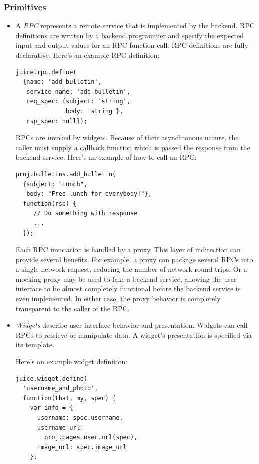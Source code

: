 \documentclass[10pt, twocolumn]{article}
\begin{document}
\subsubsection{Primitives}
\begin{itemize}
\item A \emph{RPC} represents a remote service that is implemented
  by the backend. RPC definitions are written by a backend
  programmer and specify the expected input and output values for
  an RPC function call. RPC definitions are fully declarative.
  Here's an example RPC definition:
\begin{verbatim}
juice.rpc.define(
  {name: 'add_bulletin',
   service_name: 'add_bulletin',
   req_spec: {subject: 'string',
              body: 'string'},
   rsp_spec: null});
\end{verbatim}

  RPCs are invoked by widgets. Because of their asynchronous
  nature, the caller must supply a callback function which is
  passed the response from the backend service. Here's an example
  of how to call an RPC:

\begin{verbatim}
proj.bulletins.add_bulletin(
  {subject: "Lunch",
   body: "Free lunch for everybody!"},
  function(rsp) {
     // Do something with response
     ...
  });
\end{verbatim}

  Each RPC invocation is handled by a proxy. This layer of
  indirection can provide several benefits. For example, a proxy
  can package several RPCs into a single network request, reducing
  the number of network round-trips. Or a mocking proxy may be
  used to fake a backend service, allowing the user interface to
  be almost completely functional before the backend service is
  even implemented. In either case, the proxy behavior is
  completely transparent to the caller of the RPC.

\item \emph{Widgets} describe user interface behavior and
  presentation. Widgets can call RPCs to retrieve or manipulate
  data. A widget's presentation is specified via its template.

  Here's an example widget definition:
\begin{verbatim}
juice.widget.define(
  'username_and_photo',
  function(that, my, spec) {
    var info = {
      username: spec.username,
      username_url:
        proj.pages.user.url(spec),
      image_url: spec.image_url
    };


\end{verbatim}
\end{itemize}
\end{document}
